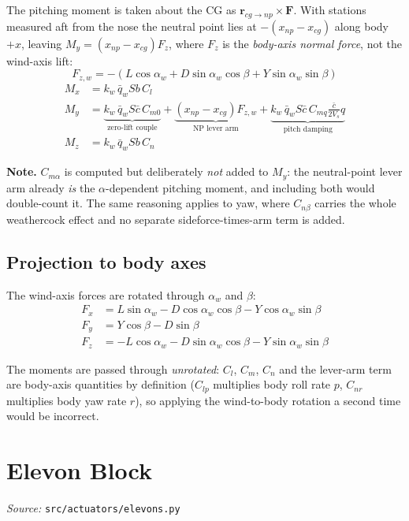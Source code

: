 \documentclass[11pt,a4paper]{article}
\newcommand{\vect}[1]{\bm{#1}}
\begin{document}
The pitching moment is taken about the CG as
$\vect r_{cg\to np}\times\vect F$. With stations measured aft from the nose the
neutral point lies at $-(x_{np}-x_{cg})$ along body $+x$, leaving
$M_y=(x_{np}-x_{cg})F_z$, where $F_z$ is the \emph{body-axis normal force}, not
the wind-axis lift:
\begin{equation}
F_{z,w}=-\left(L\cos\alpha_w+D\sin\alpha_w\cos\beta+Y\sin\alpha_w\sin\beta\right)
\end{equation}
\begin{align}
M_x&=k_w\,\bar q_w S b\,C_l\\
M_y&=\underbrace{k_w\,\bar q_w S\bar c\,C_{m0}}_{\text{zero-lift couple}}
+\underbrace{\left(x_{np}-x_{cg}\right)F_{z,w}}_{\text{NP lever arm}}
+\underbrace{k_w\,\bar q_w S\bar c\,C_{mq}\frac{\bar c}{2V_s}q}_{\text{pitch damping}}\\
M_z&=k_w\,\bar q_w S b\,C_n
\end{align}

\noindent\textbf{Note.} $C_{m\alpha}$ is computed but deliberately \emph{not}
added to $M_y$: the neutral-point lever arm already \emph{is} the
$\alpha$-dependent pitching moment, and including both would double-count it.
The same reasoning applies to yaw, where $C_{n\beta}$ carries the whole
weathercock effect and no separate sideforce-times-arm term is added.

\subsection{Projection to body axes}
The wind-axis forces are rotated through $\alpha_w$ and $\beta$:
\begin{align}
F_x&=L\sin\alpha_w-D\cos\alpha_w\cos\beta-Y\cos\alpha_w\sin\beta\\
F_y&=Y\cos\beta-D\sin\beta\\
F_z&=-L\cos\alpha_w-D\sin\alpha_w\cos\beta-Y\sin\alpha_w\sin\beta
\end{align}

The moments are passed through \emph{unrotated}: $C_l$, $C_m$, $C_n$ and the
lever-arm term are body-axis quantities by definition ($C_{lp}$ multiplies body
roll rate $p$, $C_{nr}$ multiplies body yaw rate $r$), so applying the
wind-to-body rotation a second time would be incorrect.

\section{Elevon Block}
\emph{Source:} \texttt{src/actuators/elevons.py}
\end{document}
